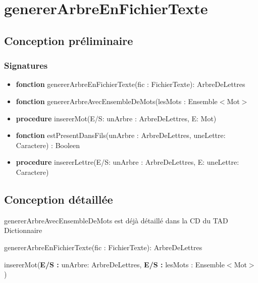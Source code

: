 \documentclass{article}
\begin{document}
    \pagestyle{empty}
    \noindent

    \section*{genererArbreEnFichierTexte}
    \subsection*{Conception préliminaire}
    
    \subsubsection*{Signatures}

	\begin{itemize}[label=$\ $, leftmargin=1cm]
		 \item \textbf{fonction} genererArbreEnFichierTexte(fic : FichierTexte): ArbreDeLettres
		 \item \textbf{fonction} genererArbreAvecEnsembleDeMots(lesMots : Ensemble$<$Mot$>$
		 \item \textbf{procedure} insererMot(E/S: unArbre : ArbreDeLettres, E: Mot)
		 
         \item \textbf{fonction} estPresentDansFils(unArbre : ArbreDeLettres, uneLettre: Caractere) : Booleen
         
         \item \textbf{procedure } insererLettre(E/S: unArbre : ArbreDeLettres, E: uneLettre: Caractere)
	\end{itemize} 

    \subsection*{Conception détaillée}
    genererArbreAvecEnsembleDeMots est déjà détaillé dans la CD du TAD Dictionnaire
    
    \begin{function}
        \SetAlgoLined
        \caption{genererArbreEnFichierTexte(fic : FichierTexte): ArbreDeLettres}
        \Declaration{}
        \Deb{
        	\Retour{}
        }
    \end{function}

    \begin{procedure}
        \SetAlgoLined
        \caption{insererMot(\textbf{E/S :} unArbre: ArbreDeLettres, \textbf{E/S :} lesMots : Ensemble$<$Mot$>$) }
        \Declaration{}
        \Deb{}
    \end{procedure}
    
\end{document}
